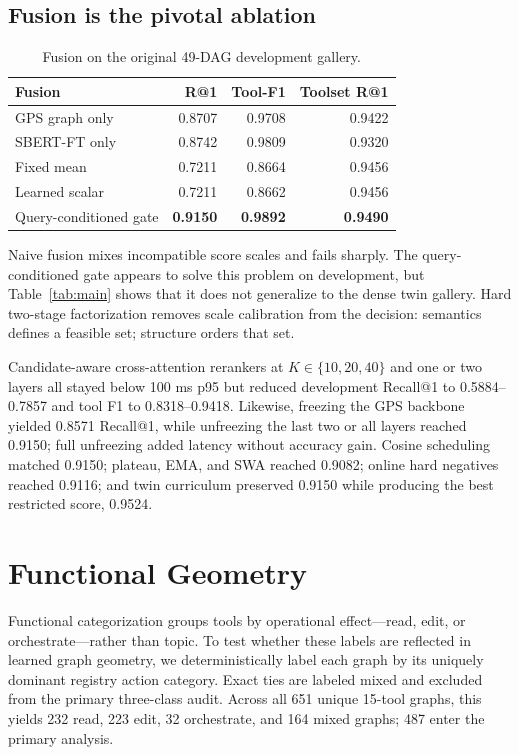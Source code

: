 \documentclass{article}
\makeatletter
\newcommand{\sbert}{\textsc{SBERT-FT}}
\newcommand{\Rone}{R@1}
\newcommand{\toolF}{Tool-F1}
\makeatother
\begin{document}
\subsection{Fusion is the pivotal ablation}

\begin{table}[t]
\caption{Fusion on the original 49-DAG development gallery.}
\label{tab:fusion}
\centering
\small
\begin{tabular}{lrrr}
\toprule
Fusion & \Rone{} & \toolF{} & Toolset R@1 \\
\midrule
GPS graph only & 0.8707 & 0.9708 & 0.9422 \\
\sbert{} only & 0.8742 & 0.9809 & 0.9320 \\
Fixed mean & 0.7211 & 0.8664 & 0.9456 \\
Learned scalar & 0.7211 & 0.8662 & 0.9456 \\
Query-conditioned gate & \textbf{0.9150} & \textbf{0.9892} & \textbf{0.9490} \\
\bottomrule
\end{tabular}
\end{table}

Naive fusion mixes incompatible score scales and fails sharply.
The query-conditioned gate appears to solve this problem on development, but Table~\ref{tab:main} shows that it does not generalize to the dense twin gallery.
Hard two-stage factorization removes scale calibration from the decision: semantics defines a feasible set; structure orders that set.

Candidate-aware cross-attention rerankers at $K\in\{10,20,40\}$ and one or two layers all stayed below 100 ms p95 but reduced development Recall@1 to 0.5884--0.7857 and tool F1 to 0.8318--0.9418.
Likewise, freezing the GPS backbone yielded 0.8571 Recall@1, while unfreezing the last two or all layers reached 0.9150; full unfreezing added latency without accuracy gain.
Cosine scheduling matched 0.9150; plateau, EMA, and SWA reached 0.9082; online hard negatives reached 0.9116; and twin curriculum preserved 0.9150 while producing the best restricted score, 0.9524.

\section{Functional Geometry}

Functional categorization groups tools by operational effect---read, edit, or orchestrate---rather than topic.
To test whether these labels are reflected in learned graph geometry, we deterministically label each graph by its uniquely dominant registry action category.
Exact ties are labeled mixed and excluded from the primary three-class audit.
Across all 651 unique 15-tool graphs, this yields 232 read, 223 edit, 32 orchestrate, and 164 mixed graphs; 487 enter the primary analysis.
\end{document}
